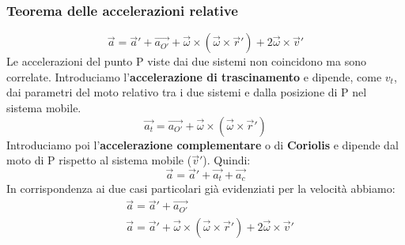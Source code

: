 \documentclass{article}
\numberwithin{equation}{subsection}
\begin{document}
\subsubsection{Teorema delle accelerazioni relative}
\begin{equation}
    \vec{a}=\vec{a}' + \vec{a_{O'}} + \vec{\omega} \times (\vec{\omega} \times \vec{r}') + 2\vec{\omega} \times \vec{v}'
\end{equation}
Le accelerazioni del punto P viste dai due sistemi non coincidono ma sono correlate. Introduciamo l'\textbf{accelerazione di trascinamento} e dipende, come $v_t$, dai parametri del moto relativo tra i due sistemi e dalla posizione di P nel sistema mobile.
\begin{equation}
    \vec{a_t}=\vec{a_{O'}}+\vec{\omega} \times (\vec{\omega} \times \vec{r}')
\end{equation}
Introduciamo poi l'\textbf{accelerazione complementare} o di \textbf{Coriolis} e dipende dal moto di P rispetto al sistema mobile ($\vec{v}'$). Quindi:
\begin{equation}
    \vec{a}=\vec{a}'+\vec{a_t}+\vec{a_c}
\end{equation}
In corrispondenza ai due casi particolari già evidenziati per la velocità abbiamo:
\begin{align}
    & \vec{a}=\vec{a}'+\vec{a_{O'}} \\
    & \vec{a} = \vec{a}' + \vec{\omega} \times (\vec{\omega} \times \vec{r}') + 2\vec{\omega} \times \vec{v}'
\end{align}
\end{document}
